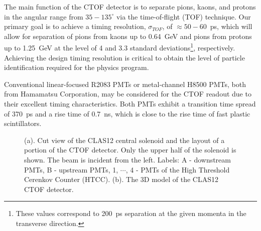 \documentclass[12pt]{article}
\begin{document}
The main function of the CTOF detector is to separate pions, kaons, and protons in 
the angular range from $35-135^\circ$ via the time-of-flight (TOF) technique. Our 
primary  goal is to achieve a timing resolution, $\sigma_{TOF}$, of $\approx 50-60$~ps, 
which will allow for separation of pions from kaons up to 0.64~GeV and pions from 
protons up to 1.25~GeV at the level of 4 and 3.3 standard deviations\footnote{These 
values correspond to 200~ps separation at the given momenta in the transverse 
direction.}, respectively. Achieving the design timing resolution is critical to obtain
the level of particle identification required for the physics program. 

Conventional linear-focused R2083 PMTs or metal-channel H8500 PMTs, both from Hamamatsu 
Corporation, may be considered for the CTOF readout due to their excellent timing 
characteristics. Both PMTs exhibit a transition time spread of 370~ps and a rise time 
of 0.7~ns, which is close to the rise time of fast plastic scintillators.

\begin{figure}[htbp]
\centering
{}
\qquad
{}
\caption{(a). Cut view of the CLAS12 central solenoid and the layout of a portion 
of the CTOF detector. Only the upper half of the solenoid is shown. The beam is 
incident from the left. Labels: A - downstream PMTs, B - upstream PMTs, 1, $\cdots$, 
4 - PMTs of the High Threshold Cerenkov Counter (HTCC). (b). The 3D model of the 
CLAS12 CTOF detector.}
\label{fig:ctoffish}
\end{figure}
\end{document}
